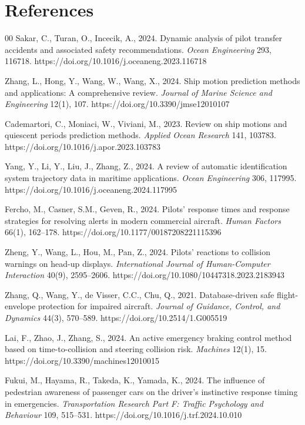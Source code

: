 \documentclass[preprint,12pt]{elsarticle}
\begin{document}
\section*{References}
\begin{thebibliography}{00}
Sakar, C., Turan, O., Incecik, A., 2024.
Dynamic analysis of pilot transfer accidents and associated safety recommendations.
\emph{Ocean Engineering} 293, 116718.
https://doi.org/10.1016/j.oceaneng.2023.116718

Zhang, L., Hong, Y., Wang, W., Wang, X., 2024.
Ship motion prediction methods and applications: A comprehensive review.
\emph{Journal of Marine Science and Engineering} 12(1), 107.
https://doi.org/10.3390/jmse12010107

Cademartori, C., Moniaci, W., Viviani, M., 2023.
Review on ship motions and quiescent periods prediction methods.
\emph{Applied Ocean Research} 141, 103783.
https://doi.org/10.1016/j.apor.2023.103783

Yang, Y., Li, Y., Liu, J., Zhang, Z., 2024.
A review of automatic identification system trajectory data in maritime applications.
\emph{Ocean Engineering} 306, 117995.
https://doi.org/10.1016/j.oceaneng.2024.117995

Fercho, M., Casner, S.M., Geven, R., 2024.
Pilots' response times and response strategies for resolving alerts in modern commercial aircraft.
\emph{Human Factors} 66(1), 162--178.
https://doi.org/10.1177/00187208221115396

Zheng, Y., Wang, L., Hou, M., Pan, Z., 2024.
Pilots' reactions to collision warnings on head-up displays.
\emph{International Journal of Human-Computer Interaction} 40(9), 2595--2606.
https://doi.org/10.1080/10447318.2023.2183943

Zhang, Q., Wang, Y., de Visser, C.C., Chu, Q., 2021.
Database-driven safe flight-envelope protection for impaired aircraft.
\emph{Journal of Guidance, Control, and Dynamics} 44(3), 570--589.
https://doi.org/10.2514/1.G005519

Lai, F., Zhao, J., Zhang, S., 2024.
An active emergency braking control method based on time-to-collision and steering collision risk.
\emph{Machines} 12(1), 15.
https://doi.org/10.3390/machines12010015

Fukui, M., Hayama, R., Takeda, K., Yamada, K., 2024.
The influence of pedestrian awareness of passenger cars on the driver's instinctive response timing in emergencies.
\emph{Transportation Research Part F: Traffic Psychology and Behaviour} 109, 515--531.
https://doi.org/10.1016/j.trf.2024.10.010


\end{thebibliography}
\end{document}
